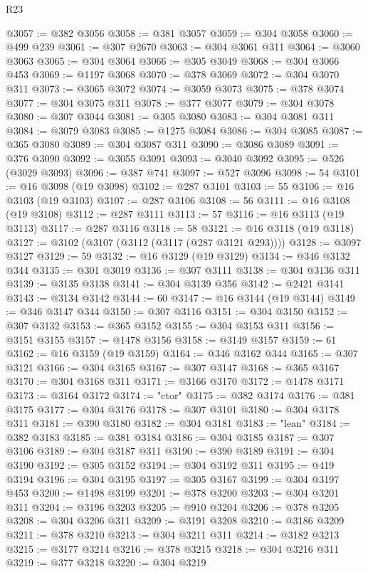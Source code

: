 \begin{lexlean}{R23}
\begin{coremodule}
@3057 := @382 @3056
@3058 := @381 @3057
@3059 := @304 @3058
@3060 := @499 @239
@3061 := @307 @2670
@3063 := @304 @3061 @311
@3064 := @3060 @3063
@3065 := @304 @3064
@3066 := @305 @3049
@3068 := @304 @3066 @453
@3069 := @1197 @3068
@3070 := @378 @3069
@3072 := @304 @3070 @311
@3073 := @3065 @3072
@3074 := @3059 @3073
@3075 := @378 @3074
@3077 := @304 @3075 @311
@3078 := @377 @3077
@3079 := @304 @3078
@3080 := @307 @3044
@3081 := @305 @3080
@3083 := @304 @3081 @311
@3084 := @3079 @3083
@3085 := @1275 @3084
@3086 := @304 @3085
@3087 := @365 @3080
@3089 := @304 @3087 @311
@3090 := @3086 @3089
@3091 := @376 @3090
@3092 := @3055 @3091
@3093 := @3040 @3092
@3095 := @526 (@3029 @3093)
@3096 := @387 @741
@3097 := @527 @3096
@3098 := 54
@3101 := @16 @3098 (@19 @3098)
@3102 := @287 @3101
@3103 := 55
@3106 := @16 @3103 (@19 @3103)
@3107 := @287 @3106
@3108 := 56
@3111 := @16 @3108 (@19 @3108)
@3112 := @287 @3111
@3113 := 57
@3116 := @16 @3113 (@19 @3113)
@3117 := @287 @3116
@3118 := 58
@3121 := @16 @3118 (@19 @3118)
@3127 := @3102 (@3107 (@3112 (@3117 (@287 @3121 @293))))
@3128 := @3097 @3127
@3129 := 59
@3132 := @16 @3129 (@19 @3129)
@3134 := @346 @3132 @344
@3135 := @301 @3019
@3136 := @307 @3111
@3138 := @304 @3136 @311
@3139 := @3135 @3138
@3141 := @304 @3139 @356
@3142 := @2421 @3141
@3143 := @3134 @3142
@3144 := 60
@3147 := @16 @3144 (@19 @3144)
@3149 := @346 @3147 @344
@3150 := @307 @3116
@3151 := @304 @3150
@3152 := @307 @3132
@3153 := @365 @3152
@3155 := @304 @3153 @311
@3156 := @3151 @3155
@3157 := @1478 @3156
@3158 := @3149 @3157
@3159 := 61
@3162 := @16 @3159 (@19 @3159)
@3164 := @346 @3162 @344
@3165 := @307 @3121
@3166 := @304 @3165
@3167 := @307 @3147
@3168 := @365 @3167
@3170 := @304 @3168 @311
@3171 := @3166 @3170
@3172 := @1478 @3171
@3173 := @3164 @3172
@3174 := "ctor"
@3175 := @382 @3174
@3176 := @381 @3175
@3177 := @304 @3176
@3178 := @307 @3101
@3180 := @304 @3178 @311
@3181 := @390 @3180
@3182 := @304 @3181
@3183 := "lean"
@3184 := @382 @3183
@3185 := @381 @3184
@3186 := @304 @3185
@3187 := @307 @3106
@3189 := @304 @3187 @311
@3190 := @390 @3189
@3191 := @304 @3190
@3192 := @305 @3152
@3194 := @304 @3192 @311
@3195 := @419 @3194
@3196 := @304 @3195
@3197 := @305 @3167
@3199 := @304 @3197 @453
@3200 := @1498 @3199
@3201 := @378 @3200
@3203 := @304 @3201 @311
@3204 := @3196 @3203
@3205 := @910 @3204
@3206 := @378 @3205
@3208 := @304 @3206 @311
@3209 := @3191 @3208
@3210 := @3186 @3209
@3211 := @378 @3210
@3213 := @304 @3211 @311
@3214 := @3182 @3213
@3215 := @3177 @3214
@3216 := @378 @3215
@3218 := @304 @3216 @311
@3219 := @377 @3218
@3220 := @304 @3219

\end{coremodule}
\end{lexlean}
